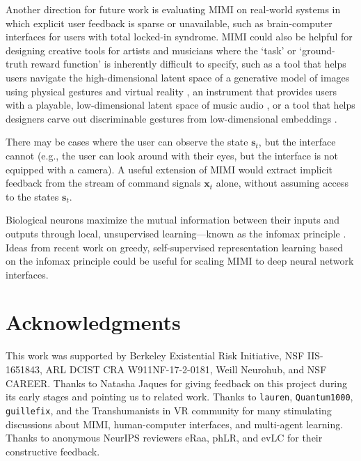 \documentclass{article}
\newcommand{\bx}{\mathbf{x}}
\newcommand{\bs}{\mathbf{s}}
\begin{document}
Another direction for future work is evaluating MIMI on real-world systems in which explicit user feedback is sparse or unavailable, such as brain-computer interfaces for users with total locked-in syndrome.
MIMI could also be helpful for designing creative tools for artists and musicians where the `task' or `ground-truth reward function' is inherently difficult to specify, such as a tool that helps users navigate the high-dimensional latent space of a generative model of images using physical gestures and virtual reality \cite{crawforddeveloping}, an instrument that provides users with a playable, low-dimensional latent space of music audio \cite{roberts2018musicvae}, or a tool that helps designers carve out discriminable gestures from low-dimensional embeddings \cite{rusu2022low}.

There may be cases where the user can observe the state $\bs_t$, but the interface cannot (e.g., the user can look around with their eyes, but the interface is not equipped with a camera).
A useful extension of MIMI would extract implicit feedback from the stream of command signals $\bx_t$ alone, without assuming access to the states $\bs_t$.

Biological neurons maximize the mutual information between their inputs and outputs through local, unsupervised learning---known as the infomax principle \cite{linsker1988self}.
Ideas from recent work on greedy, self-supervised representation learning based on the infomax principle \cite{lowe2019putting} could be useful for scaling MIMI to deep neural network interfaces.

\section{Acknowledgments}

This work was supported by Berkeley Existential Risk Initiative, NSF IIS-1651843, ARL DCIST CRA W911NF-17-2-0181, Weill Neurohub, and NSF CAREER.
Thanks to Natasha Jaques for giving feedback on this project during its early stages and pointing us to related work.
Thanks to \verb+lauren+, \verb+Quantum1000+, \verb+guillefix+, and the Transhumanists in VR community for many stimulating discussions about MIMI, human-computer interfaces, and multi-agent learning.
Thanks to anonymous NeurIPS reviewers eRaa, phLR, and evLC for their constructive feedback.





\appendix
\end{document}
